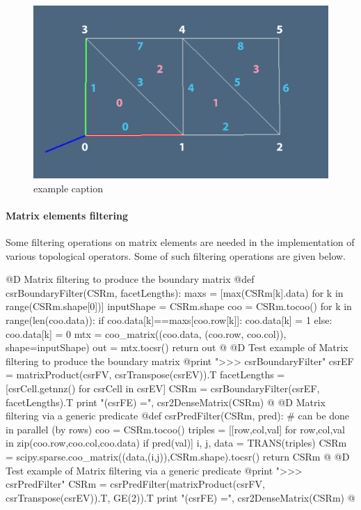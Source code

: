 \documentclass[11pt,oneside]{article}    %
\begin{document}
\begin{figure}[htbp] %
   \centering
   \includegraphics[width=0.6\linewidth]{images/2complex} 
   \caption{example caption}
   \label{fig:2complex}
\end{figure}

\paragraph{Matrix elements filtering}

Some filtering operations on matrix elements are needed in the implementation of various topological operators. Some of such filtering operations are given below.

@D Matrix filtering to produce the boundary matrix
@{def csrBoundaryFilter(CSRm, facetLengths):
    maxs = [max(CSRm[k].data) for k in range(CSRm.shape[0])]
    inputShape = CSRm.shape
    coo = CSRm.tocoo()
    for k in range(len(coo.data)):
        if coo.data[k]==maxs[coo.row[k]]: coo.data[k] = 1
        else: coo.data[k] = 0
    mtx = coo_matrix((coo.data, (coo.row, coo.col)), shape=inputShape)
    out = mtx.tocsr()
    return out
@}
@D Test example of Matrix filtering to produce the boundary matrix
@{print "\n>>> csrBoundaryFilter"
csrEF = matrixProduct(csrFV, csrTranspose(csrEV)).T
facetLengths = [csrCell.getnnz() for csrCell in csrEV]
CSRm = csrBoundaryFilter(csrEF, facetLengths).T
print "\ncsrMaxFilter(csrFE) =\n", csr2DenseMatrix(CSRm)
@}
@D Matrix filtering via a generic predicate
@{def csrPredFilter(CSRm, pred):
    # can be done in parallel (by rows)
    coo = CSRm.tocoo()
    triples = [[row,col,val] for row,col,val 
                in zip(coo.row,coo.col,coo.data) if pred(val)]
    i, j, data = TRANS(triples)
    CSRm = scipy.sparse.coo_matrix((data,(i,j)),CSRm.shape).tocsr()
    return CSRm
@}
@D Test example of Matrix filtering via a generic predicate
@{print "\n>>> csrPredFilter"
CSRm = csrPredFilter(matrixProduct(csrFV, csrTranspose(csrEV)).T, GE(2)).T
print "\nccsrPredFilter(csrFE) =\n", csr2DenseMatrix(CSRm)
@}
\end{document}

